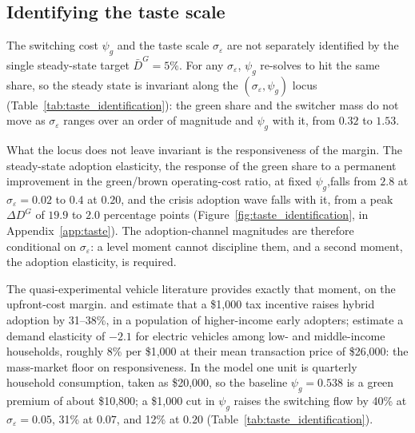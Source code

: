 \subsection{Identifying the taste scale}\label{sec:taste_id}

The switching cost $\psi_g$ and the taste scale $\sigma_\varepsilon$ are not
separately identified by the single steady-state target $\bar D^G=5\%$. For any
$\sigma_\varepsilon$, $\psi_g$ re-solves to hit the same share, so the steady state is
invariant along the $(\sigma_\varepsilon,\psi_g)$ locus
(Table~\ref{tab:taste_identification}): the green share and the switcher mass do not move as
$\sigma_\varepsilon$ ranges over an order of magnitude and $\psi_g$ with it, from
$0.32$ to $1.53$.

What the locus does not leave invariant is the responsiveness of the margin. The
steady-state adoption elasticity, the response of the green share to a permanent
improvement in the green/brown operating-cost ratio, at fixed $\psi_g$,falls from
$2.8$ at $\sigma_\varepsilon=0.02$ to $0.4$ at $0.20$, and the crisis adoption wave
falls with it, from a peak $\Delta D^G$ of $19.9$ to $2.0$ percentage points
(Figure~\ref{fig:taste_identification}, in Appendix~\ref{app:taste}). The adoption-channel magnitudes are therefore conditional
on $\sigma_\varepsilon$: a level moment cannot discipline them, and a second
moment, the adoption elasticity, is required.


The quasi-experimental vehicle literature provides exactly that moment, on the
upfront-cost margin. \citet{GallagherMuehlegger2011} and \citet{Chandra2010} estimate that a
\$1{,}000 tax incentive raises hybrid adoption by 31--38\%, in a population of
higher-income early adopters; \citet{MuehleggerRapson2022} estimate a demand elasticity of
$-2.1$ for electric vehicles among low- and middle-income households, roughly 8\% per
\$1{,}000 at their mean transaction price of \$26{,}000: the mass-market floor on
responsiveness. In the model one unit is quarterly household consumption, taken as
\$20{,}000, so the baseline $\psi_g=0.538$ is a green premium of about \$10{,}800; a
\$1{,}000 cut in $\psi_g$ raises the switching flow by 40\% at
$\sigma_\varepsilon=0.05$, 31\% at $0.07$, and 12\% at $0.20$
(Table~\ref{tab:taste_identification}).


